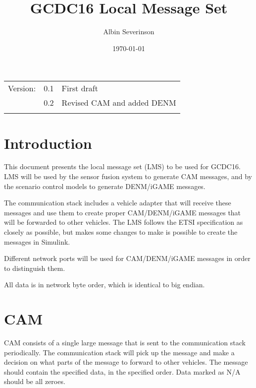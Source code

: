 \documentclass[11pt]{article}
\author{Albin Severinson}
\date{\today}
\title{GCDC16 Local Message Set}
\begin{document}
\maketitle
\tableofcontents

\begin{center}
\begin{tabular}{lrl}
Version: & 0.1 & First draft\\
 & 0.2 & Revised CAM and added DENM\\
 &  & \\
\end{tabular}
\end{center}

\newpage
\section{Introduction}
\label{sec:orgheadline1}
This document presents the local message set (LMS) to be used for
GCDC16. LMS will be used by the sensor fusion system to generate CAM
messages, and by the scenario control models to generate DENM/iGAME
messages.

The communication stack includes a vehicle adapter that will receive
these messages and use them to create proper CAM/DENM/iGAME messages
that will be forwarded to other vehicles. The LMS follows the ETSI
specification as closely as possible, but makes some changes to make
is possible to create the messages in Simulink.

Different network ports will be used for CAM/DENM/iGAME messages in
order to distinguish them.

All data is in network byte order, which is identical to big endian.


\newpage
\section{CAM}
\label{sec:orgheadline2}
CAM consists of a single large message that is sent to the
communication stack periodically. The communication stack will pick up
the message and make a decision on what parts of the message to forward
to other vehicles. The message should contain the specified data, in
the specified order. Data marked as N/A should be all zeroes.
\end{document}
